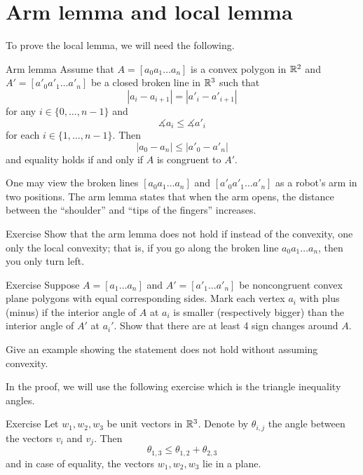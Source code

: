 \section{Arm lemma and local lemma}

To prove the local lemma, we will need the following.

\begin{thm}{Arm lemma}\label{lem:arm}
Assume that $A=[a_0 a_1\dots a_n]$ is a convex polygon in $\mathbb{R}^2$
and $A'=[a'_0 a'_1\dots a'_n]$ be a closed broken line in $\mathbb{R}^3$
such that 
$$|a_i-a_{i+1}|=|a'_i-a'_{i+1}|$$ for any $i\in\{0,\dots,n-1\}$
and 
$$\measuredangle a_i\le \measuredangle a'_i$$ 
for each $i\in\{1,\dots,n-1\}$.
Then 
$$|a_0-a_n|\le |a'_0-a'_n|$$
and equality holds if and only if $A$ is congruent to $A'$.
\end{thm}

One may view the broken lines $[a_0a_1\dots a_n]$ and $[a'_0a'_1\dots a'_n]$ as a robot's arm in two positions.
The arm lemma states that when the arm opens, 
the distance between the ``shoulder'' and ``tips of the fingers'' increases. 

\begin{thm}{Exercise}
Show that the arm lemma does not hold if 
instead of the convexity,
one only the local convexity;
that is, if you go along the broken line $a_0 a_1\dots a_n$, then you only turn left.
\end{thm}

\begin{thm}{Exercise}\label{ex:cauchy}
Suppose $A=[a_1\dots a_n]$ and $A'=[a'_1\dots a'_n]$ be noncongruent convex plane polygons with equal corresponding sides.
Mark each vertex $a_i$ with plus (minus) if the interior angle of $A$ at $a_i$ is smaller (respectively bigger) than the interior angle of $A'$ at $a_i'$.
Show that there are at least 4 sign changes around $A$.

Give an example showing the statement does not hold without assuming convexity.

\end{thm}


In the proof, we will use the following exercise which is the triangle inequality angles. 

\begin{thm}{Exercise}\label{ex:angle-triangle}
Let $w_1,w_2,w_3$ be unit vectors in $\mathbb{R}^3$.
Denote by $\theta_{i,j}$ the angle between the vectors $v_i$ and $v_j$.
Then 
$$\theta_{1,3}\le \theta_{1,2}+\theta_{2,3}$$
and in case of equality, the vectors $w_1,w_2,w_3$ lie in a plane.
\end{thm}




